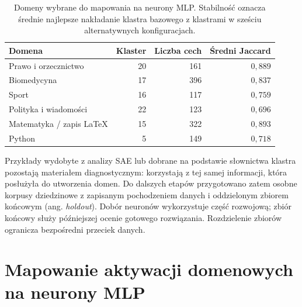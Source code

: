 \begin{table}[htbp]
\centering
\small
\begin{tabular}{lrrr}
\toprule
Domena & Klaster & Liczba cech & Średni Jaccard \\
\midrule
Prawo i orzecznictwo & 20 & 161 & $0{,}889$ \\
Biomedycyna & 17 & 396 & $0{,}837$ \\
Sport & 16 & 117 & $0{,}759$ \\
Polityka i wiadomości & 22 & 123 & $0{,}696$ \\
Matematyka / zapis LaTeX & 15 & 322 & $0{,}893$ \\
Python & 5 & 149 & $0{,}718$ \\
\bottomrule
\end{tabular}
\caption{Domeny wybrane do mapowania na neurony MLP. Stabilność oznacza średnie najlepsze nakładanie klastra bazowego z klastrami w sześciu alternatywnych konfiguracjach.}
\label{tab:wybrane_domeny}
\end{table}
Przykłady wydobyte z analizy SAE lub dobrane na podstawie słownictwa klastra pozostają materiałem diagnostycznym: korzystają z tej samej informacji, która posłużyła do utworzenia domen. Do dalszych etapów przygotowano zatem osobne korpusy dziedzinowe z zapisanym pochodzeniem danych i oddzielonym zbiorem końcowym (ang. \textit{holdout}). Dobór neuronów wykorzystuje część rozwojową; zbiór końcowy służy późniejszej ocenie gotowego rozwiązania. Rozdzielenie zbiorów ogranicza bezpośredni przeciek danych.

\section{Mapowanie aktywacji domenowych na neurony MLP}
\label{sec:mapowanie_domen_mlp}


